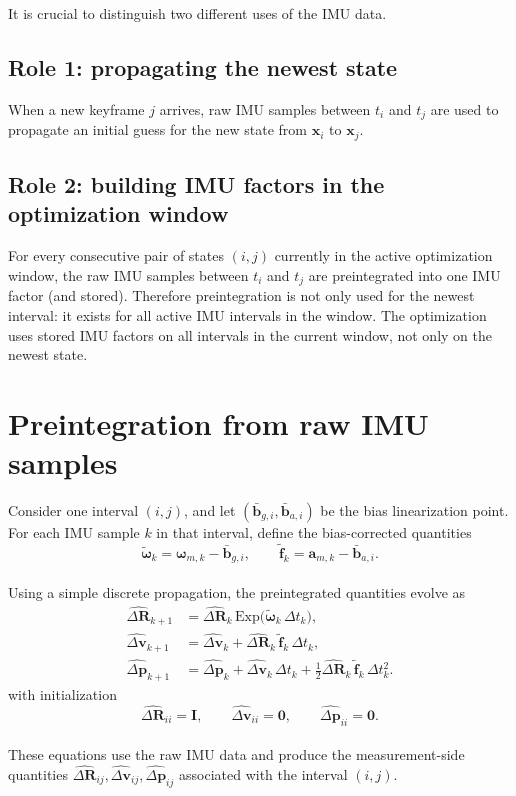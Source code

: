 \documentclass[11pt]{article}
\newcommand{\Exp}{\mathrm{Exp}}
\begin{document}
It is crucial to distinguish two different uses of the IMU data.

\subsection{Role 1: propagating the newest state}
When a new keyframe \(j\) arrives, raw IMU samples between \(t_i\) and \(t_j\) are used to propagate an initial guess for the new state from \(\mathbf{x}_i\) to \(\mathbf{x}_j\).

\subsection{Role 2: building IMU factors in the optimization window}
For every consecutive pair of states \((i,j)\) currently in the active optimization window, the raw IMU samples between \(t_i\) and \(t_j\) are preintegrated into one IMU factor (and stored).
Therefore preintegration is not only used for the newest interval: it exists for all active IMU intervals in the window.
The optimization uses stored IMU factors on all intervals in the current window, not only on the newest state.

\section{Preintegration from raw IMU samples}

Consider one interval \((i,j)\), and let \((\bar{\mathbf{b}}_{g,i},\bar{\mathbf{b}}_{a,i})\) be the bias linearization point.
For each IMU sample \(k\) in that interval, define the bias-corrected quantities
\begin{equation}
\tilde{\boldsymbol{\omega}}_k = \boldsymbol{\omega}_{m,k} - \bar{\mathbf{b}}_{g,i},
\qquad
\tilde{\mathbf{f}}_k = \mathbf{a}_{m,k} - \bar{\mathbf{b}}_{a,i}.
\end{equation}
\\
Using a simple discrete propagation, the preintegrated quantities evolve as
\begin{align}
\widehat{\Delta \mathbf{R}}_{k+1}
&= \widehat{\Delta \mathbf{R}}_k\, \Exp\!\big(\tilde{\boldsymbol{\omega}}_k\,\Delta t_k\big), \\
\widehat{\Delta \mathbf{v}}_{k+1}
&= \widehat{\Delta \mathbf{v}}_k + \widehat{\Delta \mathbf{R}}_k\,\tilde{\mathbf{f}}_k\,\Delta t_k, \\
\widehat{\Delta \mathbf{p}}_{k+1}
&= \widehat{\Delta \mathbf{p}}_k + \widehat{\Delta \mathbf{v}}_k\,\Delta t_k
+ \tfrac{1}{2}\widehat{\Delta \mathbf{R}}_k\,\tilde{\mathbf{f}}_k\,\Delta t_k^2.
\end{align}
with initialization
\begin{equation}
\widehat{\Delta \mathbf{R}}_{ii}=\mathbf{I},
\qquad
\widehat{\Delta \mathbf{v}}_{ii}=\mathbf{0},
\qquad
\widehat{\Delta \mathbf{p}}_{ii}=\mathbf{0}.
\end{equation}
\\
These equations use the raw IMU data and produce the measurement-side quantities \(\widehat{\Delta \mathbf{R}}_{ij},\widehat{\Delta \mathbf{v}}_{ij},\widehat{\Delta \mathbf{p}}_{ij}\) associated with the interval \((i,j)\).
\end{document}
